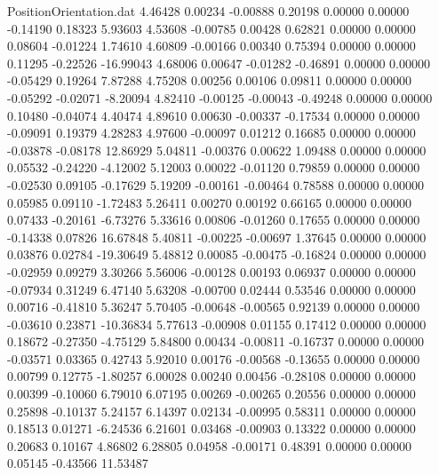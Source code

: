 \begin{filecontents}{PositionOrientation.dat}
   4.46428    0.00234   -0.00888     0.20198    0.00000    0.00000   -0.14190    0.18323    5.93603
   4.53608   -0.00785    0.00428     0.62821    0.00000    0.00000    0.08604   -0.01224    1.74610
   4.60809   -0.00166    0.00340     0.75394    0.00000    0.00000    0.11295   -0.22526  -16.99043
   4.68006    0.00647   -0.01282    -0.46891    0.00000    0.00000   -0.05429    0.19264    7.87288
   4.75208    0.00256    0.00106     0.09811    0.00000    0.00000   -0.05292   -0.02071   -8.20094
   4.82410   -0.00125   -0.00043    -0.49248    0.00000    0.00000    0.10480   -0.04074    4.40474
   4.89610    0.00630   -0.00337    -0.17534    0.00000    0.00000   -0.09091    0.19379    4.28283
   4.97600   -0.00097    0.01212     0.16685    0.00000    0.00000   -0.03878   -0.08178   12.86929
   5.04811   -0.00376    0.00622     1.09488    0.00000    0.00000    0.05532   -0.24220   -4.12002
   5.12003    0.00022   -0.01120     0.79859    0.00000    0.00000   -0.02530    0.09105   -0.17629
   5.19209   -0.00161   -0.00464     0.78588    0.00000    0.00000    0.05985    0.09110   -1.72483
   5.26411    0.00270    0.00192     0.66165    0.00000    0.00000    0.07433   -0.20161   -6.73276
   5.33616    0.00806   -0.01260     0.17655    0.00000    0.00000   -0.14338    0.07826   16.67848
   5.40811   -0.00225   -0.00697     1.37645    0.00000    0.00000    0.03876    0.02784  -19.30649
   5.48812    0.00085   -0.00475    -0.16824    0.00000    0.00000   -0.02959    0.09279    3.30266
   5.56006   -0.00128    0.00193     0.06937    0.00000    0.00000   -0.07934    0.31249    6.47140
   5.63208   -0.00700    0.02444     0.53546    0.00000    0.00000    0.00716   -0.41810    5.36247
   5.70405   -0.00648   -0.00565     0.92139    0.00000    0.00000   -0.03610    0.23871  -10.36834
   5.77613   -0.00908    0.01155     0.17412    0.00000    0.00000    0.18672   -0.27350   -4.75129
   5.84800    0.00434   -0.00811    -0.16737    0.00000    0.00000   -0.03571    0.03365    0.42743
   5.92010    0.00176   -0.00568    -0.13655    0.00000    0.00000    0.00799    0.12775   -1.80257
   6.00028    0.00240    0.00456    -0.28108    0.00000    0.00000    0.00399   -0.10060    6.79010
   6.07195    0.00269   -0.00265     0.20556    0.00000    0.00000    0.25898   -0.10137    5.24157
   6.14397    0.02134   -0.00995     0.58311    0.00000    0.00000    0.18513    0.01271   -6.24536
   6.21601    0.03468   -0.00903     0.13322    0.00000    0.00000    0.20683    0.10167    4.86802
   6.28805    0.04958   -0.00171     0.48391    0.00000    0.00000    0.05145   -0.43566   11.53487

\end{filecontents}
